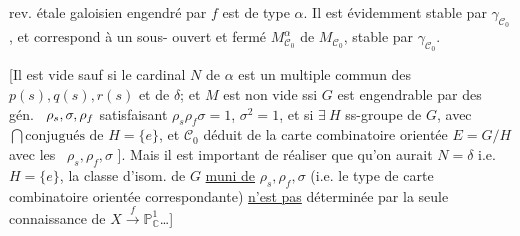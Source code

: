 rev. étale galoisien  engendré par $f$ est de type $\alpha$. Il est évidemment stable par $\gamma_{\mathcal C_0}$, et correspond à un sous- ouvert et fermé $M_{\mathcal C_0}^{\alpha}$ de $M_{\mathcal C_0}$, stable par $\gamma_{\mathcal C_0}$.

[Il est vide sauf si le cardinal $N$ de $\alpha$ est un multiple commun des $p(s),q(s),r(s)$ et de $\delta$; \deleted{$\unsure{\exists}$} et $M$ est non vide ssi \deleted{$\exists$} $G$  est engendrable par des gén.\  $\rho_s,\sigma,\rho_f$ satisfaisant $\rho_s\rho_f\sigma=1$, $\sigma^2=1$, et si \deleted{$\unsure{\forall}$} $\exists\ H$ ss-groupe de $G$, avec $\bigcap\text{conjugués de }H=\{e\}$, et $\mathcal C_0$ déduit de la carte combinatoire orientée $E=G/H$ avec les \ $\rho_s,\rho_f,\sigma$ ]. Mais il est important de réaliser que  qu'on aurait $N=\delta$ i.e.\ $H=\{e\}$, la classe d'isom. de $G$ \uline{muni de} $\rho_s,\rho_f,\sigma$ (i.e. le type de carte combinatoire orientée correspondante) \uline{n'est pas} déterminée par la seule connaissance de $X\xrightarrow{f}\mathbb P^1_{\mathbb C}$\ldots]
